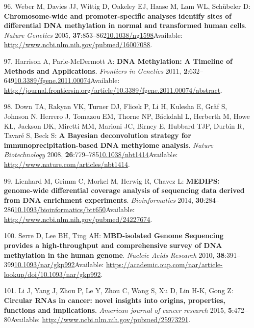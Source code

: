 \documentclass[
]{book}
\begin{document}
\leavevmode\hypertarget{ref-Weber2005}{}%
96. Weber M, Davies JJ, Wittig D, Oakeley EJ, Haase M, Lam WL, Schübeler D: \textbf{Chromosome-wide and promoter-specific analyses identify sites of differential DNA methylation in normal and transformed human cells}. \emph{Nature Genetics} 2005, \textbf{37}:853--862\href{https://doi.org/10.1038/ng1598}{10.1038/ng1598}Available: \url{http://www.ncbi.nlm.nih.gov/pubmed/16007088}.

\leavevmode\hypertarget{ref-Harrison2011}{}%
97. Harrison A, Parle-McDermott A: \textbf{DNA Methylation: A Timeline of Methods and Applications}. \emph{Frontiers in Genetics} 2011, \textbf{2}:632--649\href{https://doi.org/10.3389/fgene.2011.00074}{10.3389/fgene.2011.00074}Available: \url{http://journal.frontiersin.org/article/10.3389/fgene.2011.00074/abstract}.

\leavevmode\hypertarget{ref-Down2009}{}%
98. Down TA, Rakyan VK, Turner DJ, Flicek P, Li H, Kulesha E, Gräf S, Johnson N, Herrero J, Tomazou EM, Thorne NP, Bäckdahl L, Herberth M, Howe KL, Jackson DK, Miretti MM, Marioni JC, Birney E, Hubbard TJP, Durbin R, Tavaré S, Beck S: \textbf{A Bayesian deconvolution strategy for immunoprecipitation-based DNA methylome analysis}. \emph{Nature Biotechnology} 2008, \textbf{26}:779--785\href{https://doi.org/10.1038/nbt1414}{10.1038/nbt1414}Available: \url{http://www.nature.com/articles/nbt1414}.

\leavevmode\hypertarget{ref-Lienhard2014}{}%
99. Lienhard M, Grimm C, Morkel M, Herwig R, Chavez L: \textbf{MEDIPS: genome-wide differential coverage analysis of sequencing data derived from DNA enrichment experiments}. \emph{Bioinformatics} 2014, \textbf{30}:284--286\href{https://doi.org/10.1093/bioinformatics/btt650}{10.1093/bioinformatics/btt650}Available: \url{http://www.ncbi.nlm.nih.gov/pubmed/24227674}.

\leavevmode\hypertarget{ref-Serre2009a}{}%
100. Serre D, Lee BH, Ting AH: \textbf{MBD-isolated Genome Sequencing provides a high-throughput and comprehensive survey of DNA methylation in the human genome}. \emph{Nucleic Acids Research} 2010, \textbf{38}:391--399\href{https://doi.org/10.1093/nar/gkp992}{10.1093/nar/gkp992}Available: \url{https://academic.oup.com/nar/article-lookup/doi/10.1093/nar/gkp992}.

\leavevmode\hypertarget{ref-Li2015}{}%
101. Li J, Yang J, Zhou P, Le Y, Zhou C, Wang S, Xu D, Lin H-K, Gong Z: \textbf{Circular RNAs in cancer: novel insights into origins, properties, functions and implications.} \emph{American journal of cancer research} 2015, \textbf{5}:472--80Available: \url{http://www.ncbi.nlm.nih.gov/pubmed/25973291}.
\end{document}
